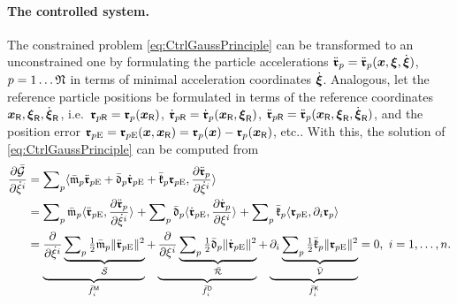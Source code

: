 \paragraph{The controlled system.}
The constrained problem \eqref{eq:CtrlGaussPrinciple} can be transformed to an unconstrained one by formulating the particle accelerations $\particlePosdd{\PidxI} = \particlePosdd{\PidxI}(\sysCoord, \sysVel, \sysVeld)$, $\PidxI=1\ldots\numParticles$ in terms of minimal acceleration coordinates $\sysVeld$.
Analogous, let the reference particle positions be formulated in terms of the reference coordinates $\sysCoordR, \sysVelR, \sysVelRd$, i.e.\ $\particlePosR{\PidxI} = \particlePos{\PidxI}(\sysCoordR)$, $\particlePosRd{\PidxI} = \particlePosd{\PidxI}(\sysCoordR, \sysVelR)$, $\particlePosRdd{\PidxI} = \particlePosdd{\PidxI}(\sysCoordR, \sysVelR, \sysVelRd)$, and the position error $\particlePosE{\PidxI} = \particlePosE{\PidxI}(\sysCoord, \sysCoordR) = \particlePos{\PidxI}(\sysCoord) - \particlePos{\PidxI}(\sysCoordR)$, etc..
With this, the solution of \eqref{eq:CtrlGaussPrinciple} can be computed from
\begin{align}
 \pdiff[\GaussianConstraintC]{\sysVelCoeffd{\LidxI}}
 &= \sumParticles \sProd{\particleMassC{\PidxI} \particlePosEdd{\PidxI} + \particleDampingC{\PidxI} \particlePosEd{\PidxI} + \particleStiffnessC{\PidxI} \particlePosE{\PidxI}}{\pdiff[\particlePosdd{\PidxI}]{\sysVelCoeffd{\LidxI}}}
\nonumber\\
 &= \sumParticles \particleMassC{\PidxI} \sProd{\particlePosEdd{\PidxI}}{\pdiff[\particlePosdd{\PidxI}]{\sysVelCoeffd{\LidxI}}}
  + \sumParticles \particleDampingC{\PidxI} \sProd{\particlePosEd{\PidxI}}{\pdiff[\particlePosd{\PidxI}]{\sysVelCoeff{\LidxI}}}
  + \sumParticles \particleStiffnessC{\PidxI} \sProd{\particlePosE{\PidxI}}{\dirDiff{\LidxI} \particlePos{\PidxI}}
\nonumber\\
 &= \underbrace{\pdiff{\sysVelCoeffd{\LidxI}} \underbrace{\sumParticles \tfrac{1}{2} \particleMassC{\PidxI}      \norm{\particlePosEdd{\PidxI}}^2}_{\accEnergyC}}_{\genForceInertiaCoeffC{\LidxI}}
  + \underbrace{\pdiff{\sysVelCoeff{\LidxI}}  \underbrace{\sumParticles \tfrac{1}{2} \particleDampingC{\PidxI}   \norm{\particlePosEd{\PidxI}}^2}_{\dissFktC}}_{\genForceDissCoeffC{\LidxI}}
  + \underbrace{\dirDiff{\LidxI}              \underbrace{\sumParticles \tfrac{1}{2} \particleStiffnessC{\PidxI} \norm{\particlePosE{\PidxI}}^2}_{\potentialEnergyC}}_{\genForceStiffCoeffC{\LidxI}}
  = 0, \ \LidxI = 1,\ldots,\dimConfigSpace.
\nonumber\\[-4ex]
\label{eq:SolCtrlGaussPrinciple}
\end{align}
